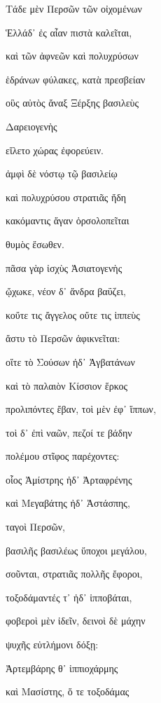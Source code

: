 \noindent {}Τάδε μὲν Περσῶν τῶν οἰχομένων\par
\noindent \numeroverso{}Ἑλλάδ᾽ ἐς αἶαν πιστὰ καλεῖται,\par
\noindent \numeroverso{}καὶ τῶν ἀφνεῶν καὶ πολυχρύσων\par
\noindent \numeroverso{}ἑδράνων φύλακες, κατὰ πρεσβείαν\par
\noindent {}οὓς αὐτὸς ἄναξ Ξέρξης βασιλεὺς\par
\noindent \numeroverso{}Δαρειογενὴς\par
\noindent \numeroverso{}εἵλετο χώρας ἐφορεύειν.\par
\noindent {}\numeroverso{}ἀμφὶ δὲ νόστῳ τῷ βασιλείῳ\par
\noindent \numeroverso{}καὶ πολυχρύσου στρατιᾶς ἤδη\par
\noindent {}κακόμαντις ἄγαν ὀρσολοπεῖται\par
\noindent \numeroverso{}θυμὸς ἔσωθεν.\par
\noindent \numeroverso{}πᾶσα γὰρ ἰσχὺς Ἀσιατογενὴς\par
\noindent \numeroverso{}ᾤχωκε, νέον δ᾽ ἄνδρα βαΰζει,\par
\noindent \numeroverso{}κοὔτε τις ἄγγελος οὔτε τις ἱππεὺς\par
\noindent {}ἄστυ τὸ Περσῶν ἀφικνεῖται:\par
\noindent \numeroverso{}οἵτε τὸ Σούσων ἠδ᾽ Ἀγβατάνων\par
\noindent \numeroverso{}καὶ τὸ παλαιὸν Κίσσιον ἕρκος\par
\noindent \numeroverso{}προλιπόντες ἔβαν, τοὶ μὲν ἐφ᾽ ἵππων,\par
\noindent \numeroverso{}τοὶ δ᾽ ἐπὶ ναῶν, πεζοί τε βάδην\par
\noindent {}πολέμου στῖφος παρέχοντες:\par
\noindent \numeroverso{}οἷος Ἀμίστρης ἠδ᾽ Ἀρταφρένης\par
\noindent \numeroverso{}καὶ Μεγαβάτης ἠδ᾽ Ἀστάσπης,\par
\noindent \numeroverso{}ταγοὶ Περσῶν,\par
\noindent \numeroverso{}βασιλῆς βασιλέως ὕποχοι μεγάλου,\par
\noindent {}σοῦνται, στρατιᾶς πολλῆς ἔφοροι,\par
\noindent {}\numeroverso{}τοξοδάμαντές τ᾽ ἠδ᾽ ἱπποβάται,\par
\noindent \numeroverso{}φοβεροὶ μὲν ἰδεῖν, δεινοὶ δὲ μάχην\par
\noindent \numeroverso{}ψυχῆς εὐτλήμονι δόξῃ:\par
\noindent \numeroverso{}Ἀρτεμβάρης θ᾽ ἱππιοχάρμης\par
\noindent {}καὶ Μασίστης, ὅ τε τοξοδάμας\par
